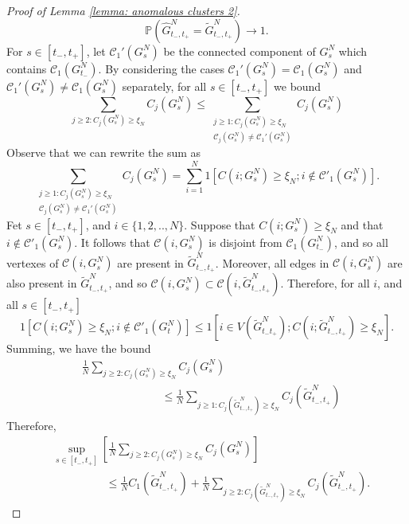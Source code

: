 \documentclass[11pt, notitlepage]{article}
\begin{document}
\begin{proof}[Proof of Lemma \ref{lemma: anomalous clusters 2}]
\begin{equation}
    \mathbb{P}\left(\widehat{G}^N_{t_-, t_+}=\widetilde{G}^N_{t_-, t_+}\right)\rightarrow 1.
\end{equation} For $s\in [t_-, t_+]$, let $\mathcal{C}_1'(G^N_s)$ be the connected component of $G^N_s$ which contains $\mathcal{C}_1(G^N_{t_-})$. By considering the cases $\mathcal{C}_1'(G^N_s)=\mathcal{C}_1(G^N_s)$ and $\mathcal{C}_1'(G^N_s)\neq \mathcal{C}_1(G^N_s)$ separately, for all $s\in[t_-,t_+]$ we bound \begin{equation}
    \sum_{j\geq 2: C_j(G^N_s)\geq \xi_N} C_j(G^N_s) \leq \sum_{\substack{j\geq 1: C_j(G^N_s)\geq \xi_N \\[1ex] \mathcal{C}_j(G^N_s)\neq \mathcal{C}_1'(G^N_s)}} C_j(G^N_s)
\end{equation} Observe that we can rewrite the sum as \begin{equation}
    \sum_{\substack{j\geq 1: C_j(G^N_s)\geq \xi_N \\[1ex] \mathcal{C}_j(G^N_s)\neq \mathcal{C}_1'(G^N_s)}}  C_j(G^N_s) = \sum_{i=1}^N 1[C(i; G^N_s)\geq \xi_N; i \not \in \mathcal{C}'_1(G^N_s)].
\end{equation}  Fet $s\in [t_-, t_+]$, and $i\in\{1, 2,..,N\}$. Suppose that $C(i; G^N_s)\geq \xi_N$ and that $i \not \in \mathcal{C}'_1(G^N_s)$. It follows that $\mathcal{C}(i, G^N_s)$ is disjoint from $\mathcal{C}_1(G^N_{t_-})$, and so all vertexes of $\mathcal{C}(i, G^N_s)$ are present in $\widetilde{G}^N_{t_-,t_+}$. Moreover, all edges in $\mathcal{C}(i, G^N_s)$ are also present in $\widetilde{G}^N_{t_-,t_+}$, and so $\mathcal{C}(i, G^N_s) \subset \mathcal{C}(i, \widetilde{G}^N_{t_-,t_+})$. Therefore, for all $i$, and all $s\in [t_-, t_+]$ \begin{equation}
    1[C(i; G^N_s)\geq \xi_N; i \not \in \mathcal{C}'_1(G^N_t)] \leq 1[i \in V(\widetilde{G}^N_{t_-t_+}); C(i; \widetilde{G}^N_{t_-,t_+})\geq \xi_N].
\end{equation} Summing, we have the bound \begin{equation}\begin{split}
&\frac{1}{N}\sum_{j\geq 2: C_j(G^N_s)\geq \xi_N} C_j(G^N_s) \\&\hspace{3cm} \leq \frac{1}{N}\sum_{j\geq 1: C_j(\widetilde{G}^N_{t_-,t_+})\geq \xi_N} C_j(\widetilde{G}^N_{t_-,t_+}) 
\end{split} \end{equation} Therefore, \begin{equation}\begin{split}
    &\sup_{s\in [t_-, t_+]} \left[\frac{1}{N}\sum_{j\geq 2: C_j(G^N_s)\geq \xi_N} C_j(G^N_s)\right] \\[1ex] &\hspace{2cm} \leq \frac{1}{N}C_1(\widetilde{G}^N_{t_-, t_+})+\frac{1}{N}\sum_{j\geq 2: C_j(\widetilde{G}^N_{t_-,t_+})\geq \xi_N} C_j(\widetilde{G}^N_{t_-,t_+}).

\end{split}
\end{equation}
\end{proof}
\end{document}
